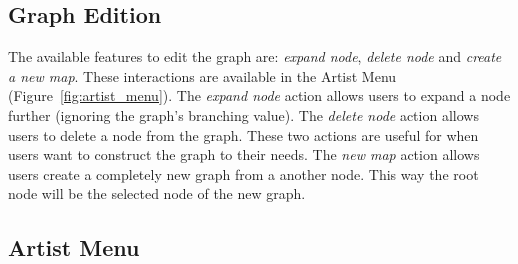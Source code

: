 \documentclass{article}
\begin{document}
    \subsection{Graph Edition}
    \label{sub:graph_edition}
      
      The available features to edit the graph are: \textit{expand node}, \textit{delete node} and \textit{create a new map}. These interactions are available in the Artist Menu (Figure~\ref{fig:artist_menu}).
      The \textit{expand node} action allows users to expand a node further (ignoring the graph's branching value).
      The \textit{delete node} action allows users to delete a node from the graph.
      These two actions are useful for when users want to construct the graph to their needs.
      The \emph{new map} action allows users create a completely new graph from a another node. This way the root node will be the selected node of the new graph.

    \subsection{Artist Menu}
    \label{sub:artist_menu}
    
\end{document}
